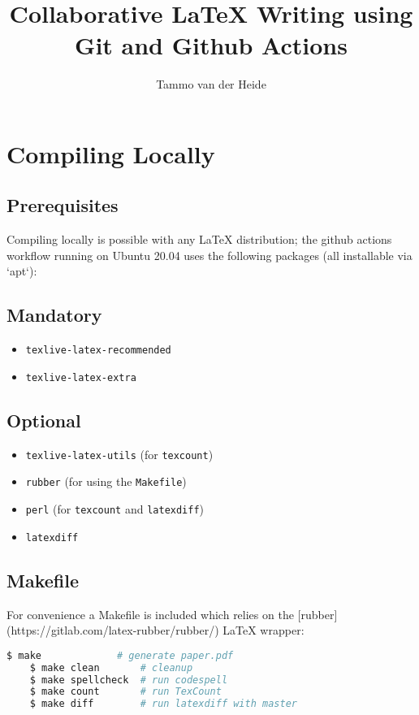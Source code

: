 \documentclass[]{article}
\title{Collaborative LaTeX Writing using Git and Github Actions}
\author{Tammo van der Heide}
\begin{document}
\maketitle

\section{Compiling Locally}

\subsection{Prerequisites}

Compiling locally is possible with any LaTeX distribution; the github actions workflow running on Ubuntu 20.04 uses the following packages (all installable via `apt`):

\subsection*{Mandatory}
\begin{itemize}

	\item \texttt{texlive-latex-recommended}
	\item \texttt{texlive-latex-extra}

\end{itemize}

\subsection*{Optional}
\begin{itemize}

	\item \texttt{texlive-latex-utils} \quad (for \texttt{texcount})
	\item \texttt{rubber} \quad (for using the \texttt{Makefile})
	\item \texttt{perl} \quad (for \texttt{texcount} and \texttt{latexdiff})
	\item \texttt{latexdiff}

\end{itemize}


\subsection{Makefile}

For convenience a Makefile is included which relies on the [rubber](https://gitlab.com/latex-rubber/rubber/) LaTeX wrapper:


\begin{center}
	\begin{lstlisting}[language=Bash,morekeywords={make}]
	$ make             # generate paper.pdf
	$ make clean       # cleanup
	$ make spellcheck  # run codespell
	$ make count       # run TexCount
	$ make diff        # run latexdiff with master
	\end{lstlisting}
\end{center}
\end{document}
